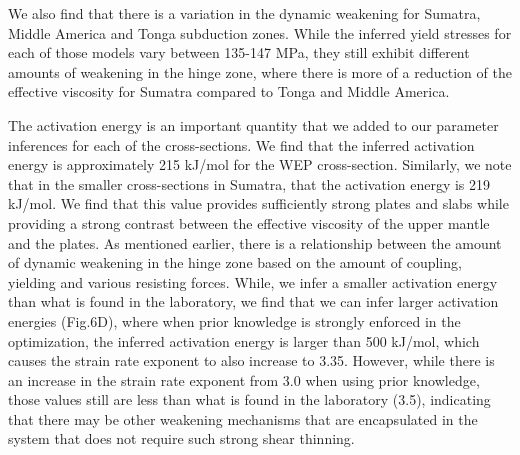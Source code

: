 \documentclass[12pt]{article}
\begin{document}
{We also find that there is a variation in the dynamic weakening for Sumatra, Middle America and Tonga subduction zones. While the inferred yield stresses for each of those models vary between 135-147 MPa, they still exhibit different amounts of weakening in the hinge zone, where there is more of a reduction of the effective viscosity for Sumatra compared to Tonga and Middle America.
  
  The activation energy is an important quantity that we added to our parameter inferences for each of the cross-sections. We find that the inferred activation energy is approximately 215 kJ/mol for the WEP cross-section. Similarly, we note that in the smaller cross-sections in Sumatra, that the activation energy is 219 kJ/mol. We find that this value provides sufficiently strong plates and slabs while providing a strong contrast between the effective viscosity of the upper mantle and the plates. As mentioned earlier, there is a relationship between the amount of dynamic weakening in the hinge zone based on the amount of coupling, yielding and various resisting forces. While, we infer a smaller activation energy than what is found in the laboratory, we find that we can infer larger activation energies (Fig.6D), where when prior knowledge is strongly enforced in the optimization, the inferred activation energy is larger than 500 kJ/mol, which causes the strain rate exponent to also increase to 3.35. However, while there is an increase in the strain rate exponent from 3.0 when using prior knowledge, those values still are less than what is found in the laboratory (3.5), indicating that there may be other weakening mechanisms that are encapsulated in the system that does not require such strong shear thinning.
  
}
\end{document}
